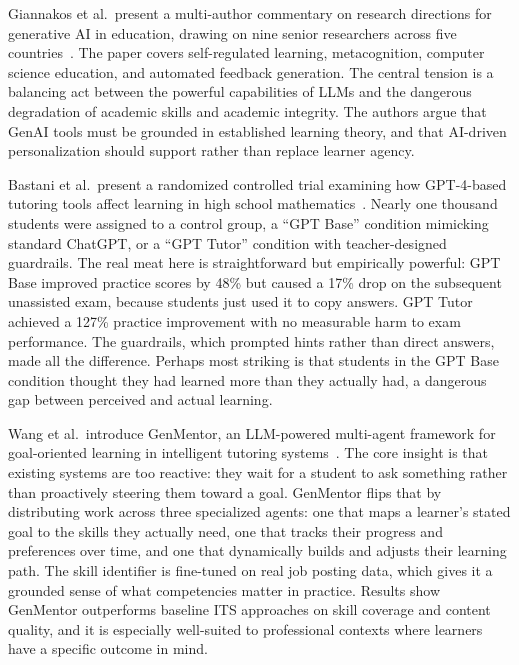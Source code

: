 \documentclass[12pt]{article}
\begin{document}
Giannakos et al.\ present a multi-author commentary on research directions for generative AI in education, drawing on nine senior researchers across five countries~\cite{giannakos2024promise}. The paper covers self-regulated learning, metacognition, computer science education, and automated feedback generation. The central tension is a balancing act between the powerful capabilities of LLMs and the dangerous degradation of academic skills and academic integrity. The authors argue that GenAI tools must be grounded in established learning theory, and that AI-driven personalization should support rather than replace learner agency.

\newpage

Bastani et al.\ present a randomized controlled trial examining how GPT-4-based tutoring tools affect learning in high school mathematics~\cite{bastani2024generative}. Nearly one thousand students were assigned to a control group, a ``GPT Base'' condition mimicking standard ChatGPT, or a ``GPT Tutor'' condition with teacher-designed guardrails. The real meat here is straightforward but empirically powerful: GPT Base improved practice scores by 48\% but caused a 17\% drop on the subsequent unassisted exam, because students just used it to copy answers. GPT Tutor achieved a 127\% practice improvement with no measurable harm to exam performance. The guardrails, which prompted hints rather than direct answers, made all the difference. Perhaps most striking is that students in the GPT Base condition thought they had learned more than they actually had, a dangerous gap between perceived and actual learning.

Wang et al.\ introduce GenMentor, an LLM-powered multi-agent framework for goal-oriented learning in intelligent tutoring systems~\cite{wang2025genmentor}. The core insight is that existing systems are too reactive: they wait for a student to ask something rather than proactively steering them toward a goal. GenMentor flips that by distributing work across three specialized agents: one that maps a learner's stated goal to the skills they actually need, one that tracks their progress and preferences over time, and one that dynamically builds and adjusts their learning path. The skill identifier is fine-tuned on real job posting data, which gives it a grounded sense of what competencies matter in practice. Results show GenMentor outperforms baseline ITS approaches on skill coverage and content quality, and it is especially well-suited to professional contexts where learners have a specific outcome in mind.
\end{document}
